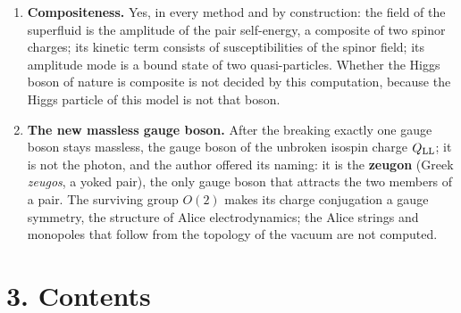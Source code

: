 \documentclass[
  10pt,
]{article}
\providecommand{\tightlist}{%
  \setlength{\itemsep}{0pt}\setlength{\parskip}{0pt}}
\begin{document}
\begin{enumerate}
  \begin{enumerate}
  \def\labelenumii{(\alph{enumii})}
  \setcounter{enumii}{1}
  \tightlist
  \item
    In no method can the superfluid be the Higgs field of the Standard
    Model: the DiracLike spinor carries no electroweak quantum numbers,
    so the condensate is a singlet of the electroweak group, whatever
    its numbers.
  \end{enumerate}
\item
  \textbf{Compositeness.} Yes, in every method and by construction: the
  field of the superfluid is the amplitude of the pair self-energy, a
  composite of two spinor charges; its kinetic term consists of
  susceptibilities of the spinor field; its amplitude mode is a bound
  state of two quasi-particles. Whether the Higgs boson of nature is
  composite is not decided by this computation, because the Higgs
  particle of this model is not that boson.
\item
  \textbf{The new massless gauge boson.} After the breaking exactly one
  gauge boson stays massless, the gauge boson of the unbroken isospin
  charge \(Q_{\rm LL}\); it is not the photon, and the author offered
  its naming: it is the \textbf{zeugon} (Greek \emph{zeugos}, a yoked
  pair), the only gauge boson that attracts the two members of a pair.
  The surviving group \(O(2)\) makes its charge conjugation a gauge
  symmetry, the structure of Alice electrodynamics; the Alice strings
  and monopoles that follow from the topology of the vacuum are not
  computed.
\end{enumerate}

\hypertarget{contents}{%
\section{3. Contents}\label{contents}}
\end{document}
